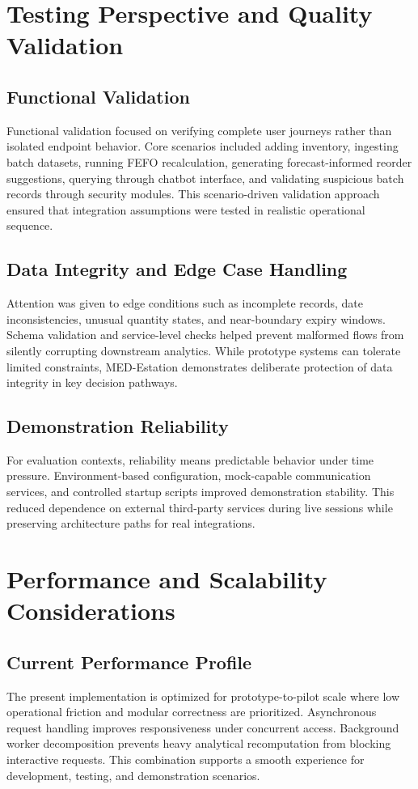 \documentclass[12pt,a4paper]{article}
\begin{document}
\section{Testing Perspective and Quality Validation}
\subsection{Functional Validation}
Functional validation focused on verifying complete user journeys rather than isolated endpoint behavior. Core scenarios included adding inventory, ingesting batch datasets, running FEFO recalculation, generating forecast-informed reorder suggestions, querying through chatbot interface, and validating suspicious batch records through security modules. This scenario-driven validation approach ensured that integration assumptions were tested in realistic operational sequence.

\subsection{Data Integrity and Edge Case Handling}
Attention was given to edge conditions such as incomplete records, date inconsistencies, unusual quantity states, and near-boundary expiry windows. Schema validation and service-level checks helped prevent malformed flows from silently corrupting downstream analytics. While prototype systems can tolerate limited constraints, MED-Estation demonstrates deliberate protection of data integrity in key decision pathways.

\subsection{Demonstration Reliability}
For evaluation contexts, reliability means predictable behavior under time pressure. Environment-based configuration, mock-capable communication services, and controlled startup scripts improved demonstration stability. This reduced dependence on external third-party services during live sessions while preserving architecture paths for real integrations.

\section{Performance and Scalability Considerations}
\subsection{Current Performance Profile}
The present implementation is optimized for prototype-to-pilot scale where low operational friction and modular correctness are prioritized. Asynchronous request handling improves responsiveness under concurrent access. Background worker decomposition prevents heavy analytical recomputation from blocking interactive requests. This combination supports a smooth experience for development, testing, and demonstration scenarios.
\end{document}
